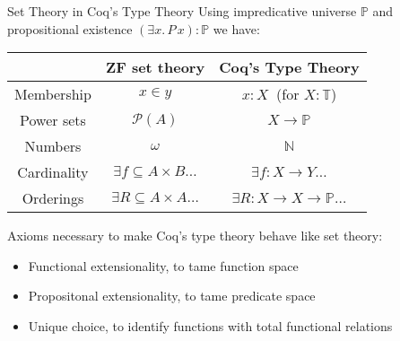 \documentclass[xcolor=dvipsnames,compress,aspectratio=169]{beamer}
\newcommand{\MBB}[1]{\ensuremath{\mathbb{#1}}\xspace}  %
\newcommand{\MCL}[1]{\ensuremath{\mathcal{#1}}\xspace} %
\newcommand{\Nat}{\MBB{N}}   %
\newcommand{\Pow}{\MCL P}
\newcommand{\Prop}{\MBB P}
\newcommand{\Type}{\MBB T}
\begin{document}
\begin{frame}{Set Theory in Coq's Type Theory}
	\vspace{0.2cm}
	Using impredicative universe $\Prop$ and propositional existence $(\exists x.\,P\,x):\Prop$ we have:
	
	\vspace{0.2cm}
	\begin{center}
	\begin{tabular}{c|c|c}
				&ZF set theory&Coq's Type Theory\\\hline
				\vphantom{\vdots}Membership&$x\in y$&$x:X~$ (for $X:\Type$)\\[0.2cm]
				Power sets&$\Pow(A)$&$X\to\Prop$\\[0.2cm]
				Numbers&$\omega$&$\Nat$\\[0.2cm]
				Cardinality&$\exists f\subseteq A\times B\dots$&$\exists f:X\to Y\dots$\\[0.2cm]
				Orderings&$\exists R\subseteq A\times A\dots$&$\exists R:X\to X\to\Prop\dots$
	\end{tabular}
	\end{center}
	
	\pause
	\vspace{0.2cm}
	Axioms necessary to make Coq's type theory behave like set theory:
	\begin{itemize}
	\item Functional extensionality, to tame function space
	\item Propositonal extensionality, to tame predicate space
	\item Unique choice, to identify functions with total functional relations
	\end{itemize}
\end{frame}

\newcommand{\trunc}[1]{||#1||}
\newcommand{\hprop}{\mathsf{hProp}}
\newcommand{\hset}{\mathsf{hSet}}
\newcommand{\Ord}{\mathsf{Ord}}
\end{document}

